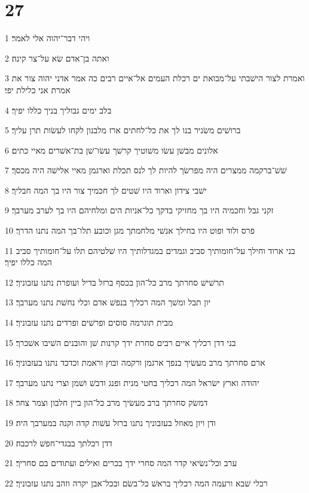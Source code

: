 \chapter{27}

\par 1 ויהי דבר־יהוה אלי לאמר׃
\par 2 ואתה בן־אדם שׂא על־צר קינה׃
\par 3 ואמרת לצור הישׁבתי על־מבואת ים רכלת העמים אל־איים רבים כה אמר אדני יהוה צור את אמרת אני כלילת יפי׃
\par 4 בלב ימים גבוליך בניך כללו יפיך׃
\par 5 ברושׁים משׂניר בנו לך את כל־לחתים ארז מלבנון לקחו לעשׂות תרן עליך׃
\par 6 אלונים מבשׁן עשׂו משׁוטיך קרשׁך עשׂו־שׁן בת־אשׁרים מאיי כתים׃
\par 7 שׁשׁ־ברקמה ממצרים היה מפרשׂך להיות לך לנס תכלת וארגמן מאיי אלישׁה היה מכסך׃
\par 8 ישׁבי צידון וארוד היו שׁטים לך חכמיך צור היו בך המה חבליך׃
\par 9 זקני גבל וחכמיה היו בך מחזיקי בדקך כל־אניות הים ומלחיהם היו בך לערב מערבך׃
\par 10 פרס ולוד ופוט היו בחילך אנשׁי מלחמתך מגן וכובע תלו־בך המה נתנו הדרך׃
\par 11 בני ארוד וחילך על־חומותיך סביב וגמדים במגדלותיך היו שׁלטיהם תלו על־חומותיך סביב המה כללו יפיך׃
\par 12 תרשׁישׁ סחרתך מרב כל־הון בכסף ברזל בדיל ועופרת נתנו עזבוניך׃
\par 13 יון תבל ומשׁך המה רכליך בנפשׁ אדם וכלי נחשׁת נתנו מערבך׃
\par 14 מבית תוגרמה סוסים ופרשׁים ופרדים נתנו עזבוניך׃
\par 15 בני דדן רכליך איים רבים סחרת ידך קרנות שׁן והובנים השׁיבו אשׁכרך׃
\par 16 ארם סחרתך מרב מעשׂיך בנפך ארגמן ורקמה ובוץ וראמת וכדכד נתנו בעזבוניך׃
\par 17 יהודה וארץ ישׂראל המה רכליך בחטי מנית ופנג ודבשׁ ושׁמן וצרי נתנו מערבך׃
\par 18 דמשׂק סחרתך ברב מעשׂיך מרב כל־הון ביין חלבון וצמר צחר׃
\par 19 ודן ויון מאוזל בעזבוניך נתנו ברזל עשׁות קדה וקנה במערבך היה׃
\par 20 דדן רכלתך בבגדי־חפשׁ לרכבה׃
\par 21 ערב וכל־נשׂיאי קדר המה סחרי ידך בכרים ואילים ועתודים בם סחריך׃
\par 22 רכלי שׁבא ורעמה המה רכליך בראשׁ כל־בשׂם ובכל־אבן יקרה וזהב נתנו עזבוניך׃
